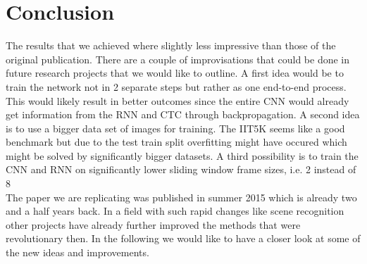 \documentclass{utue} %
\begin{document}
\section{Conclusion}
The results that we achieved where slightly less impressive than those of the original publication. There are a couple of improvisations that could be done in future research projects that we would like to outline. A first idea would be to train the network not in 2 separate steps but rather as one end-to-end process. This would likely result in better outcomes since the entire CNN would already get information from the RNN and CTC through backpropagation. A second idea is to use a bigger data set of images for training. The IIT5K seems like a good benchmark but due to the test train split overfitting might have occured which might be solved by significantly bigger datasets. A third possibility is to train the CNN and RNN on significantly lower sliding window frame sizes, i.e. 2 instead of 8 %
\\
The paper we are replicating was published in summer 2015 which is already two and a half years back. In a field with such rapid changes like scene recognition other projects have already further improved the methods that were revolutionary then. In the following we would like to have a closer look at some of the new ideas and improvements. 




\end{document}
